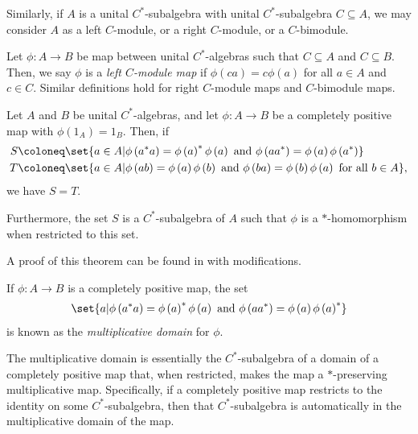 Similarly, if $A$ is a unital $C^{\ast}$-subalgebra with unital $C^{\ast}$-subalgebra $C\subseteq A$, we may consider $A$ as a left $C$-module, or a right $C$-module, or a $C$-bimodule. 
\begin{definition}
  Let $\phi\colon A\rightarrow B$ be map between unital $C^{\ast}$-algebras such that $C\subseteq A$ and $C\subseteq B$. Then, we say $\phi$ is a \textit{left $C$-module map} if $\phi\left( ca \right) = c\phi\left( a \right)$ for all $a\in A$ and $c\in C$. Similar definitions hold for right $C$-module maps and $C$-bimodule maps.
\end{definition}
\begin{theorem}\label{thm:preview_multiplicative_domain}
  Let $A$ and $B$ be unital $C^{\ast}$-algebras, and let $\phi\colon A\rightarrow B$ be a completely positive map with $\phi\left(1_A\right) = 1_B$. Then, if
  \begin{align*}
    S &\coloneq\set{a\in A | \phi\left( a^{\ast}a \right) = \phi\left( a \right)^{\ast}\phi\left( a \right)\text{ and }\phi\left( aa^{\ast} \right) = \phi\left( a \right)\phi\left( a^{\ast} \right)}\\
      T&\coloneq \set{a\in A | \phi\left( ab \right) = \phi\left( a \right)\phi\left( b \right)\text{ and }\phi\left( ba \right) = \phi\left( b \right)\phi\left( a \right)\text{ for all }b\in A},
  \end{align*}
  we have $S = T$.\newline

  Furthermore, the set $S$ is a $C^{\ast}$-subalgebra of $A$ such that $\phi$ is a $\ast$-homomorphism when restricted to this set.
\end{theorem}
A proof of this theorem can be found in \cite{completely_bounded_maps_and_operator_algebras} with modifications. 
\begin{definition}
  If $\phi\colon A\rightarrow B$ is a completely positive map, the set
  \begin{align*}
    \set{a | \phi\left( a^{\ast}a \right) = \phi\left( a \right)^{\ast}\phi\left( a \right)\text{ and }\phi\left( aa^{\ast} \right) = \phi\left( a \right)\phi\left( a \right)^{\ast}}
  \end{align*}
  is known as the \textit{multiplicative domain} for $\phi$.
\end{definition}
The multiplicative domain is essentially the $C^{\ast}$-subalgebra of a domain of a completely positive map that, when restricted, makes the map a $\ast$-preserving multiplicative map. Specifically, if a completely positive map restricts to the identity on some $C^{\ast}$-subalgebra, then that $C^{\ast}$-subalgebra is automatically in the multiplicative domain of the map.
